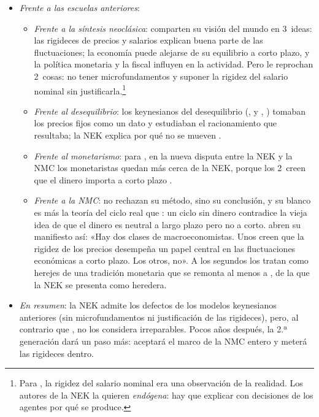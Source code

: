 \documentclass[11pt]{article}
\begin{document}
\begin{itemize}
\begin{itemize}
\begin{itemize}
\begin{enumerate}
{\begin{itemize}
\item las fricciones nominales son condición necesaria, pero no suficiente, para que los precios no se ajusten y lo hagan las cantidades;
\item las rigideces reales son compatibles con precios nominales flexibles;
\item la no neutralidad del dinero solo aparece cuando hay rigideces nominales.
\end{itemize}}
      \end{enumerate}
    \end{itemize}
  \end{itemize}
\item \emph{Frente a las escuelas anteriores}:
  \begin{itemize}
  \item \emph{Frente a la síntesis neoclásica}: comparten su visión del mundo en 3~ideas: las rigideces de precios y salarios explican buena parte de las fluctuaciones; la economía puede alejarse de su equilibrio a corto plazo, y la política monetaria y la fiscal influyen en la actividad. Pero le reprochan 2~cosas: no tener microfundamentos y suponer la rigidez del salario nominal sin justificarla.\footnote{Para , la rigidez del salario nominal era una observación de la realidad. Los autores de la NEK la quieren \emph{endógena}: hay que explicar con decisiones de los agentes por qué se produce.}
  \item \emph{Frente al desequilibrio}: los keynesianos del desequilibrio (,  y , ) tomaban los precios fijos como un dato y estudiaban el racionamiento que resultaba; la NEK explica por qué no se mueven .
  \item \emph{Frente al monetarismo}: para \textcite{MankiwRomer1991New}, en la nueva disputa entre la NEK y la NMC los monetaristas quedan más cerca de la NEK, porque los 2~creen que el dinero importa a corto plazo .
  \item \emph{Frente a la NMC}: no rechazan su método, sino su conclusión, y su blanco es más la teoría del ciclo real que : un ciclo sin dinero contradice la vieja idea de que el dinero es neutral a largo plazo pero no a corto. \textcite{BallMankiw1994Manifesto} abren su manifiesto así: «Hay dos clases de macroeconomistas. Unos creen que la rigidez de los precios desempeña un papel central en las fluctuaciones económicas a corto plazo. Los otros, no». A los segundos los tratan como herejes de una tradición monetaria que se remonta al menos a , de la que la NEK se presenta como heredera.
  \end{itemize}
\item \emph{En resumen}: la NEK admite los defectos de los modelos keynesianos anteriores (sin microfundamentos ni justificación de las rigideces), pero, al contrario que , no los considera irreparables. Pocos años después, la 2.ª generación dará un paso más: aceptará el marco de la NMC entero y meterá las rigideces dentro.
\end{itemize}
\end{document}
